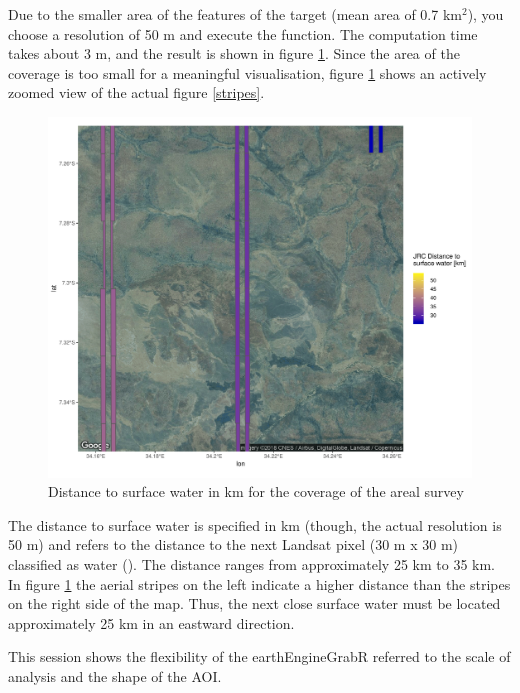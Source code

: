 Due to the smaller area of the features of the target (mean area of 0.7 km$^2$), you choose a resolution of 50 m and execute the function. The computation time takes about 3 m, and the result is shown in figure \ref{session_2}. Since the area of the coverage is too small for a meaningful visualisation, figure \ref{session_2} shows an actively zoomed view of the actual figure \ref{stripes}. 

\begin{center}
	\begin{figure}[h]
		\begin{center}
			\includegraphics[width=15cm]{images/smalle-scale-analysis-cropped.pdf}
			\caption{Distance to surface water in km for the coverage of the areal survey}
			\label{session_2}
		\end{center}
	\end{figure}
\end{center}

The distance to surface water is specified in km (though, the actual resolution is 50 m) and refers to the distance to the next Landsat pixel (30 m x 30 m) classified as water (\cite{pekel2016high}). The distance ranges from approximately 25 km to 35 km. In figure \ref{session_2} the aerial stripes on the left indicate a higher distance than the stripes on the right side of the map. Thus, the next close surface water must be located approximately 25 km in an eastward direction. 

This session shows the flexibility of the earthEngineGrabR referred to the scale of analysis and the shape of the AOI.

